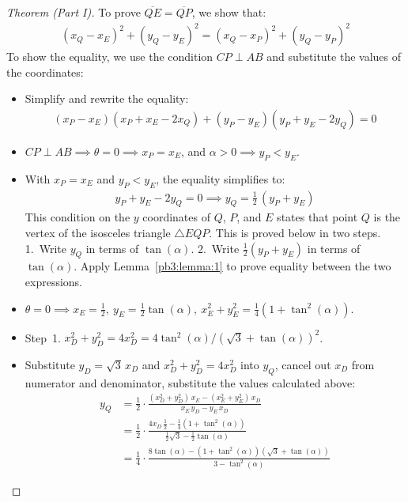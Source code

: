 \begin{proof}[Theorem (Part I)]
To prove $\overline{QE}=\overline{QP}$, we show that:
\begin{align*}
(x_{Q}-x_{E})^{2} + (y_{Q}-y_{E})^{2}
  = (x_{Q}-x_{P})^{2} + (y_{Q}-y_{P})^{2}
\end{align*}
To show the equality, we use the condition $CP \perp AB$ and substitute the values of the coordinates:
\begin{itemize}
\item Simplify and rewrite the equality:
\begin{align*}
(x_{P}-x_{E}) (x_{P}+x_{E}-2x_{Q})
+ (y_{P}-y_{E}) (y_{P}+y_{E}-2y_{Q})
= 0
\end{align*}
\item $CP \perp AB \implies \theta=0 \implies x_{P}=x_{E}$, and $\alpha>0 \implies y_{P}<y_{E}$.
\item With $x_{P}=x_{E}$ and $y_{P}<y_{E}$, the equality simplifies to:
\begin{align*}
y_{P} + y_{E} - 2y_{Q} = 0
\implies 
y_{Q} = \frac{1}{2} \, (y_{P} + y_{E})
\end{align*}
This condition on the $y$ coordinates of $Q$, $P$, and $E$ states that point $Q$ is the vertex of the isosceles triangle $\triangle EQP$. This is proved below in two steps. 1.~Write $y_{Q}$ in terms of $\tan(\alpha)$. 2.~Write $\frac{1}{2}(y_{P}+y_{E})$ in terms of $\tan(\alpha)$. Apply Lemma~\ref{pb3:lemma:1} to prove equality between the two expressions. 
\item $\theta=0 \implies x_{E}=\frac{1}{2}, \ y_{E}=\frac{1}{2}\tan(\alpha), \ x_{E}^{2}+y_{E}^{2}=\frac{1}{4}(1+\tan^{2}(\alpha))$.
\item Step~1. $x_{D}^{2}+y_{D}^{2}=4x_{D}^{2}=4\tan^{2}(\alpha)/(\sqrt{3}+\tan(\alpha))^{2}$.
\item Substitute $y_{D}=\sqrt{3}\,x_{D}$ and $x_{D}^{2}+y_{D}^{2}=4x_{D}^{2}$ into $y_{Q}$, cancel out $x_{D}$ from numerator and denominator, substitute the values calculated above:
\begin{align*}
y_{Q} & = \frac{1}{2} \cdot \frac{(x_{D}^{2}+y_{D}^{2}) \, x_{E} - (x_{E}^{2}+y_{E}^{2}) \, x_{D}}{x_{E} \, y_{D} - y_{E} \, x_{D}}
\\[1ex]
& = \frac{1}{2} \cdot \frac{4x_{D} \, \frac{1}{2} - \frac{1}{4} (1+\tan^{2}(\alpha))}{\frac{1}{2}\sqrt{3}-\frac{1}{2}\tan(\alpha)}
\\[1ex]
& = \frac{1}{4} \cdot \frac{8\tan(\alpha)-(1+\tan^{2}(\alpha))(\sqrt{3}+\tan(\alpha))}{3 - \tan^{2}(\alpha)}
\end{align*}

\end{itemize}
\end{proof}

